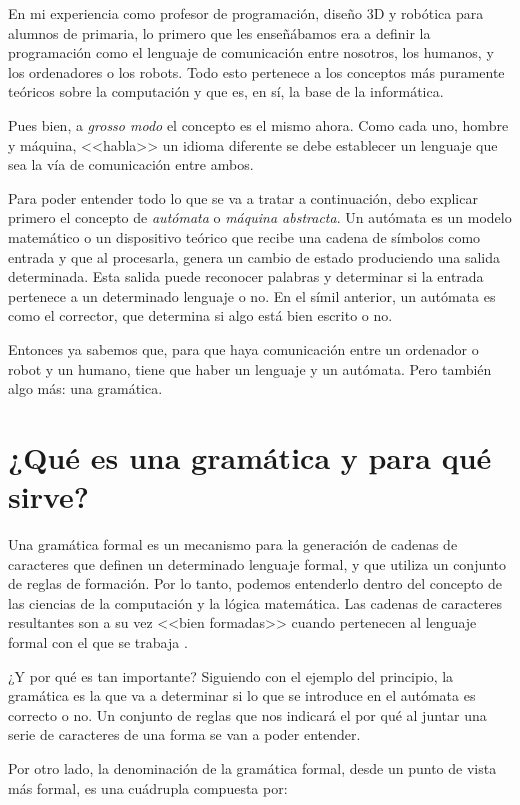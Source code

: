 
En mi experiencia como profesor de programación, diseño 3D y robótica para alumnos de primaria, lo primero que les enseñábamos era a definir la programación como el lenguaje de comunicación entre nosotros, los humanos, y los ordenadores o los robots. Todo esto pertenece a los conceptos más puramente teóricos sobre la computación y que es, en sí, la base de la informática. 

Pues bien, a \emph{grosso modo} el concepto es el mismo ahora. Como cada uno, hombre y máquina, <<habla>> un idioma diferente se debe establecer un lenguaje que sea la vía de comunicación entre ambos. 

Para poder entender todo lo que se va a tratar a continuación, debo explicar primero el concepto de \textit{autómata} o \textit{máquina abstracta}. Un autómata es un modelo matemático o un dispositivo teórico que recibe una cadena de símbolos como entrada y que al procesarla, genera un cambio de estado produciendo una salida determinada. Esta salida puede reconocer palabras y determinar si la entrada pertenece a un determinado lenguaje o no. En el símil anterior, un autómata es como el corrector, que determina si algo está bien escrito o no. 

Entonces ya sabemos que, para que haya comunicación entre un ordenador o robot y un humano, tiene que haber un lenguaje y un autómata. Pero también algo más: una gramática.

\section{¿Qué es una gramática y para qué sirve?}

Una gramática formal es un mecanismo para la generación de cadenas de caracteres que definen un determinado lenguaje formal, y que utiliza un conjunto de reglas de formación. Por lo tanto, podemos entenderlo dentro del concepto de las ciencias de la computación y la lógica matemática. Las cadenas de caracteres resultantes son a su vez <<bien formadas>> cuando pertenecen al lenguaje formal con el que se trabaja \cite{aho1986compilers}.

¿Y por qué es tan importante? Siguiendo con el ejemplo del principio, la gramática es la que va a determinar si lo que se introduce en el autómata es correcto o no. Un conjunto de reglas que nos indicará el por qué al juntar una serie de caracteres de una forma se van a poder entender.

Por otro lado, la denominación de la gramática formal, desde un punto de vista más formal, es una cuádrupla compuesta por:

